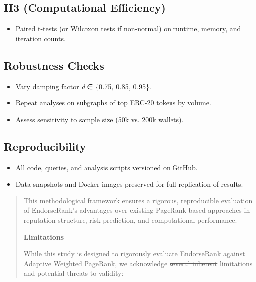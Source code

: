 \documentclass[
]{article}
\begin{document}
\subsection{H3 (Computational Efficiency)}\label{h3-computational-efficiency}

\begin{itemize}
\item
  Paired t-tests (or Wilcoxon tests if non-normal) on runtime, memory, and iteration counts.
\end{itemize}

\subsection{Robustness Checks}\label{robustness-checks}

\begin{itemize}
\item
  Vary damping factor \emph{d} ∈ \{0\emph{.}75\emph{,} 0\emph{.}85\emph{,} 0\emph{.}95\}.
\item
  Repeat analyses on subgraphs of top ERC-20 tokens by volume.
\item
  Assess sensitivity to sample size (50k vs. 200k wallets).
\end{itemize}

\subsection{Reproducibility}\label{reproducibility}

\begin{itemize}
\item
  All code, queries, and analysis scripts versioned on GitHub.
\item
  Data snapshots and Docker images preserved for full replication of results.
\end{itemize}

\begin{quote}
This methodological framework ensures a rigorous, reproducible evaluation of EndorseRank's advantages over existing PageRank-based approaches in reputation structure, risk prediction, and computational performance.

\protect{}\label{jkv0mfuoi5pt}{}\textbf{Limitations}

While this study is designed to rigorously evaluate EndorseRank against Adaptive Weighted PageRank, we acknowledge \st{several inherent} limitations and potential threats to validity:
\end{quote}
\end{document}
